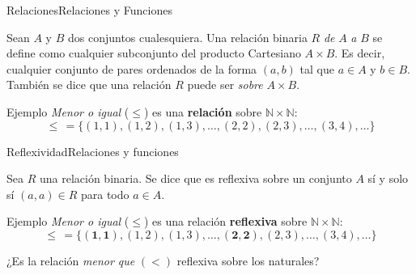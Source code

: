 \documentclass[spanish]{beamer}
\begin{document}
\begin{frame}{Relaciones}{Relaciones y Funciones}
    \begin{definition}
        Sean $A$ y $B$ dos conjuntos cualesquiera. Una \alert{relación binaria} $R$ \textit{de} $A$ \textit{a} $B$ se define como cualquier subconjunto del producto Cartesiano $A \times B$.
        Es decir, cualquier conjunto de pares ordenados de la forma $(a,b)$ tal que $a \in A$ y $b \in B$.
        También se dice que una relación $R$ puede ser \textit{sobre} $A \times B$.
    \end{definition} \pause
    \bigskip
    \begin{exampleblock}{Ejemplo}
        \textit{Menor o igual} ($\leq$) es una \textbf{relación} sobre $\mathbb{N} \times \mathbb{N}$:
        \[\leq \, = \{(1,1), (1,2), (1,3), \dots , (2,2), (2,3), \dots , (3,4), \dots \}\]
    \end{exampleblock}
\end{frame}

\begin{frame}{Reflexividad}{Relaciones y funciones}

    \begin{definition}
        Sea $R$ una relación binaria. Se dice que es \alert{reflexiva} sobre un conjunto $A$ sí y solo sí $(a,a) \in R$ para todo $a \in A$.
    \end{definition} \pause
    \bigskip
    \begin{exampleblock}{Ejemplo}
        \textit{Menor o igual} ($\leq$) es una relación \textbf{reflexiva} sobre $\mathbb{N} \times \mathbb{N}$:
        \[\leq \, = \{\mathbf{(1,1)}, (1,2), (1,3), \dots , \mathbf{(2,2)}, (2,3), \dots , (3,4), \dots \}\]
    \end{exampleblock} \pause
    \bigskip
    ¿Es la relación \textit{menor que} $(<)$ reflexiva sobre los naturales?
\end{frame}
\end{document}

